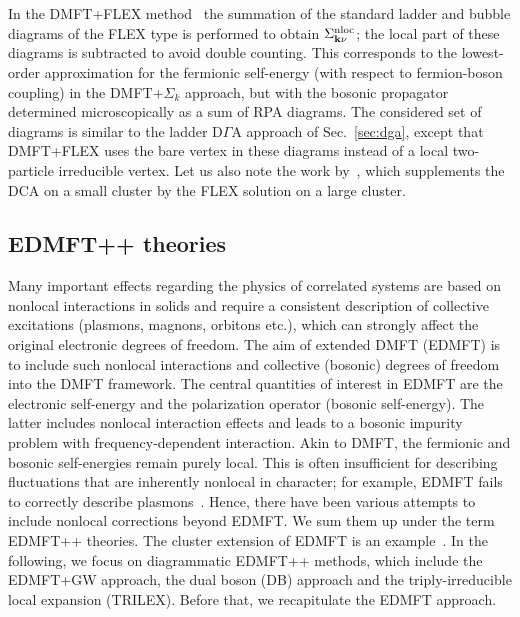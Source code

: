 \documentclass[rmp,aps,reprint,amsmath,amssymb,superscriptaddress,showpacs,nofootinbib]{revtex4-1}
\begin{document}
In the DMFT+FLEX method~\cite{Gukelberger2015,Kitatani2015} the summation of the standard ladder and bubble diagrams of the FLEX type is performed to obtain ${\Sigma}^{\rm nloc}_{\mathbf{k}\nu}$; the local part of these diagrams is subtracted to avoid double counting. This corresponds to the lowest-order approximation for the fermionic self-energy (with respect to fermion-boson coupling) in the DMFT+$\Sigma_k$ approach, but with the bosonic propagator determined microscopically as a sum of RPA diagrams. The considered set of diagrams is similar to the ladder D$\Gamma$A approach of Sec.~\ref{sec:dga}, except that DMFT+FLEX uses the bare vertex in these diagrams instead of a local two-particle irreducible vertex.
Let us also note the work by~, which supplements the DCA on a small cluster by the FLEX solution on a large cluster.

\subsection{EDMFT++ theories}
\label{sec:edmftpp}

Many important effects regarding the physics of correlated systems are based on nonlocal interactions in solids and require a consistent description of collective excitations (plasmons, magnons, orbitons etc.), which can strongly affect the original electronic degrees of freedom. The aim of extended DMFT (EDMFT) \cite{Sengupta1995,Si1996,Kajueter96,Smith00,Chitra01,Sun02} is to include such nonlocal interactions  and collective (bosonic) degrees of freedom into the  DMFT framework. The central quantities of interest in EDMFT are the electronic self-energy and the polarization operator (bosonic self-energy). The latter includes nonlocal interaction effects and leads to a bosonic impurity problem with frequency-dependent interaction. Akin to DMFT, the fermionic and bosonic self-energies remain purely local. This  is often insufficient for describing fluctuations that are inherently nonlocal in character; for example, EDMFT  fails to correctly describe plasmons~\cite{Hafermann2014a}. Hence, there have been various attempts to include nonlocal corrections beyond  EDMFT. We sum them up under the term EDMFT++ theories. The cluster extension of EDMFT is an example~\cite{Pixley2015}. In the following, we focus on  diagrammatic EDMFT++  methods, which include the EDMFT+GW approach, the dual boson (DB) approach and the triply-irreducible local expansion (TRILEX). Before that, we recapitulate the EDMFT approach.
\end{document}
